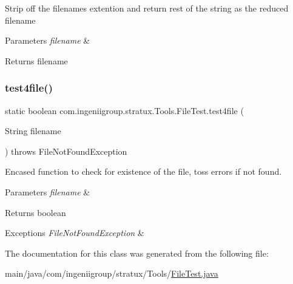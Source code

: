 Strip off the filenames extention and return rest of the string as the \textquotesingle{}reduced\textquotesingle{} filename


\begin{DoxyParams}{Parameters}
{\em filename} & \\
\hline
\end{DoxyParams}
\begin{DoxyReturn}{Returns}
filename 
\end{DoxyReturn}
\mbox{\label{classcom_1_1ingeniigroup_1_1stratux_1_1_tools_1_1_file_test_a8a15050b9f5f142a250a44caa7295cd3}} 
\subsubsection{\texorpdfstring{test4file()}{test4file()}}
{\footnotesize\ttfamily static boolean com.\+ingeniigroup.\+stratux.\+Tools.\+File\+Test.\+test4file (\begin{DoxyParamCaption}\item[{String}]{filename }\end{DoxyParamCaption}) throws File\+Not\+Found\+Exception\hspace{0.3cm}{\ttfamily [static]}}

Encased function to check for existence of the file, toss errors if not found.


\begin{DoxyParams}{Parameters}
{\em filename} & \\
\hline
\end{DoxyParams}
\begin{DoxyReturn}{Returns}
boolean 
\end{DoxyReturn}

\begin{DoxyExceptions}{Exceptions}
{\em File\+Not\+Found\+Exception} & \\
\hline
\end{DoxyExceptions}


The documentation for this class was generated from the following file\+:\begin{DoxyCompactItemize}
\item 
main/java/com/ingeniigroup/stratux/\+Tools/\hyperlink{_file_test_8java}{File\+Test.\+java}\end{DoxyCompactItemize}

